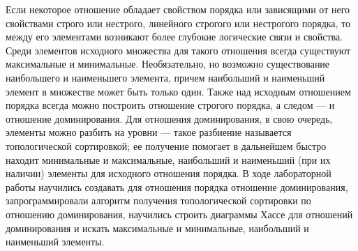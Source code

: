 \documentclass[12pt]{article}
\begin{document}
	Если некоторое отношение обладает свойством порядка или зависящими от него свойствами строго или нестрого, линейного строгого или нестрогого порядка, то между его элементами возникают более глубокие логические связи и свойства. Среди элементов исходного множества для такого отношения всегда существуют максимальные и минимальные. Необязательно, но возможно существование наибольшего и наименьшего элемента, причем наибольший и наименьший элемент в множестве может быть только один. Также над исходным отношением порядка всегда можно построить отношение строгого порядка, а следом --- и отношение доминирования. Для отношения доминирования, в свою очередь, элементы можно разбить на уровни --- такое разбиение называется топологической сортировкой; ее получение помогает в дальнейшем быстро находит минимальные и максимальные, наибольший и наименьший (при их наличии) элементы для исходного отношения порядка. В ходе лабораторной работы научились создавать для отношения порядка отношение доминирования, запрограммировали алгоритм получения топологической сортировки по отношению доминирования, научились строить диаграммы Хассе для отношений доминирования и искать максимальные и минимальные, наибольший и наименьший элементы.
\end{document}
